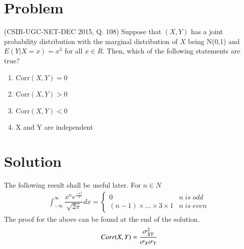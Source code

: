 \documentclass[journal,12pt,twocolumn]{IEEEtran}
\begin{document}
\section{Problem}
(CSIR-UGC-NET-DEC 2015, Q. 108) Suppose that $(X,Y)$ has a joint probability distribution with the marginal distribution of $X$ being N(0,1) and $E(Y|X=x)=x^3$ for all $x \in R$. Then, which of the following statements are true?
\begin{enumerate}
    \item Corr$(X,Y) = 0$
    \item Corr$(X,Y) > 0$
    \item Corr$(X,Y) < 0$
    \item X and Y are independent
\end{enumerate}
\section{Solution}
The following result shall be useful later. For $n \in N$
\begin{align}
    \int_{-\infty}^{\infty} \dfrac{x^n e^{\frac{-x^2}{2}}}{\sqrt{2\pi}}dx = 
    \begin{cases}
    0 & n\; is\; odd\\
    (n-1)\times...\times3\times1 & n\; is\; even
    \end{cases}
\end{align}
The proof for the above can be found at the end of the solution.
\begin{align}
    Corr(X,Y) = \cfrac{\sigma_{XY}^2}{\sigma_X\sigma_Y}
    \label{correlationofxy}
\end{align}
\end{document}
